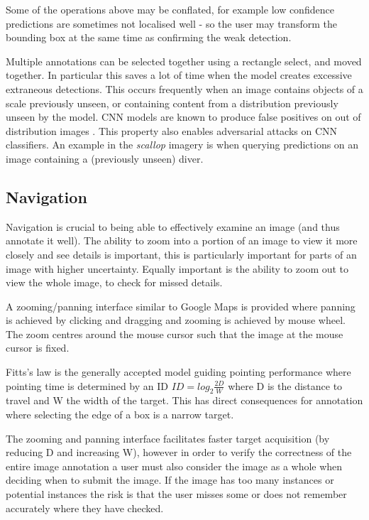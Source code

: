 Some of the operations above may be conflated, for example low confidence predictions are sometimes not localised well - so the user may transform the bounding box at the same time as confirming the weak detection.


Multiple annotations can be selected together using a rectangle select, and moved together. In particular this saves a lot of time when the model creates excessive extraneous detections. This occurs frequently when an image contains objects of a scale previously unseen, or containing content from a distribution previously unseen by the model. \gls{CNN} models are known to produce false positives on out of distribution images \cite{Hendrycks2016,Lee2018}. This property also enables adversarial attacks on \gls{CNN} classifiers. An example in the \emph{scallop} imagery is when querying predictions on an image containing a (previously unseen) diver.



\subsection {Navigation}

Navigation is crucial to being able to effectively examine an image (and thus annotate it well). The ability to zoom into a portion of an image to view it more closely and see details is important, this is particularly important for parts of an image with higher uncertainty. Equally important is the ability to zoom out to view the whole image, to check for missed details. 

A zooming/panning interface similar to Google Maps is provided where panning is achieved by clicking and dragging and zooming is achieved by mouse wheel. The zoom centres around the mouse cursor such that the image at the mouse cursor is fixed.

Fitts's law is the generally accepted model guiding pointing performance where pointing time is determined by an \gls{ID} $ ID = log_2 \frac{2D}{W} $ where D is the distance to travel and W the width of the target. This has direct consequences for annotation where selecting the edge of a box is a narrow target. 

The zooming and panning interface facilitates faster target acquisition (by reducing D and increasing W), however in order to verify the correctness of the entire image annotation a user must also consider the image as a whole when deciding when to submit the image. If the image has too many instances or potential instances the risk is that the user misses some or does not remember accurately where they have checked. 



